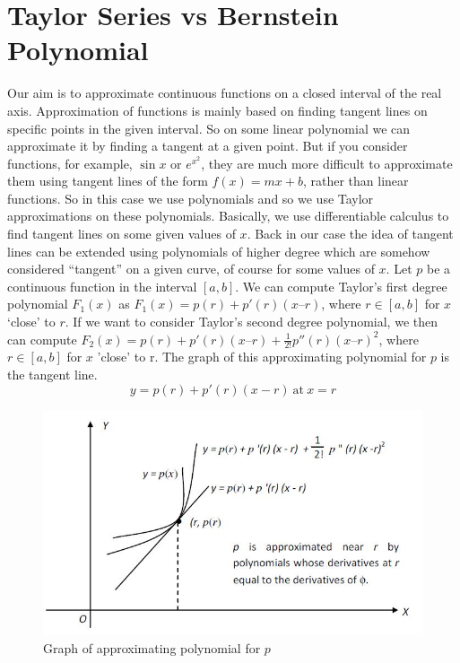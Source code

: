 \documentclass{article}
\begin{document}
\section{Taylor Series vs Bernstein Polynomial}\label{sec:tsvsbp}
Our aim is to approximate continuous functions on a closed interval of the real axis. Approximation of functions is mainly based on finding tangent lines on specific points in the given interval. So on some linear polynomial we can approximate it by finding a tangent at a given point. But if you consider functions, for example, $\sin x$ or  $e^{x^2} $, they are much more difficult to approximate them using tangent lines of the form $f(x) =mx+b$, rather than linear functions. So in this case we use polynomials and so we use Taylor approximations on these polynomials. Basically, we use differentiable calculus to find tangent lines on some given values of $x$. Back in our case the idea of tangent lines can be extended using polynomials of higher degree which are somehow considered ``tangent'' on a given curve, of course for some values of $x$.
Let $p$ be a continuous function in the interval $[a,b]$. We can compute Taylor’s first degree polynomial $F_1(x)$ as $F_1(x)=p(r) + p'(r) (x – r)$, where $r\in[a,b]$ for $x$ `close' to $r$. If we want to consider Taylor’s second degree polynomial, we then can compute $F_2(x)= p(r) + p '(r) (x – r)+ \frac{1}{2!}p''(r) (x – r)^2$, where $r \in [a,b]$ for $x$ 'close' to r.
The graph of this approximating polynomial for $p$ is the tangent line.
\begin{equation*}
    y=p(r)+p'(r)(x-r) \ \text{at}\ x=r
\end{equation*}
\begin{figure}[h!]
\centering
\includegraphics[width=1\textwidth]{Project-weierstrass.JPG}
    \caption{Graph of approximating polynomial for $p$}
    \label{fig:1}
\end{figure}
\end{document}
